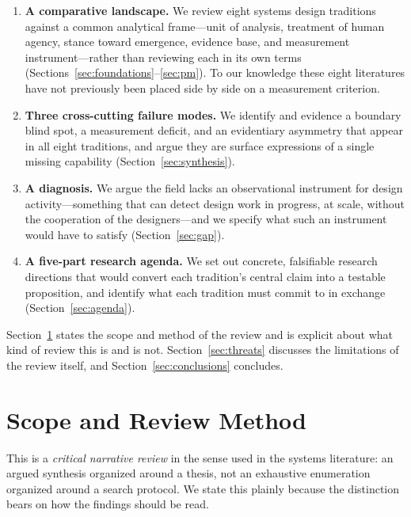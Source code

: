 \documentclass[11pt,a4paper]{article}
\begin{document}
\begin{enumerate}
\item \textbf{A comparative landscape.} We review eight systems design
traditions against a common analytical frame---unit of analysis, treatment of
human agency, stance toward emergence, evidence base, and measurement
instrument---rather than reviewing each in its own terms
(Sections~\ref{sec:foundations}--\ref{sec:pm}). To our knowledge these eight
literatures have not previously been placed side by side on a measurement
criterion.

\item \textbf{Three cross-cutting failure modes.} We identify and evidence a
boundary blind spot, a measurement deficit, and an evidentiary asymmetry that
appear in all eight traditions, and argue they are surface expressions of a
single missing capability (Section~\ref{sec:synthesis}).

\item \textbf{A diagnosis.} We argue the field lacks an observational instrument
for design activity---something that can detect design work in progress, at
scale, without the cooperation of the designers---and we specify what such an
instrument would have to satisfy (Section~\ref{sec:gap}).

\item \textbf{A five-part research agenda.} We set out concrete, falsifiable
research directions that would convert each tradition's central claim into a
testable proposition, and identify what each tradition must commit to in
exchange (Section~\ref{sec:agenda}).
\end{enumerate}

Section~\ref{sec:method} states the scope and method of the review and is
explicit about what kind of review this is and is not.
Section~\ref{sec:threats} discusses the limitations of the review itself, and
Section~\ref{sec:conclusions} concludes.

\section{Scope and Review Method}
\label{sec:method}

This is a \emph{critical narrative review} in the sense used in the systems
literature: an argued synthesis organized around a thesis, not an exhaustive
enumeration organized around a search protocol. We state this plainly because
the distinction bears on how the findings should be read.
\end{document}
